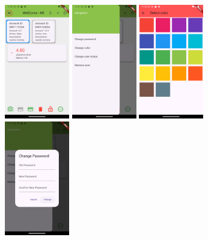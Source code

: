 \documentclass[a4paper,12pt,twoside]{ThesisStyle}
\begin{document}
\begin{figure}[h]
    \centering
    \includegraphics[width=0.25\textwidth]{imatges/userGestion.png}
    \includegraphics[width=0.25\textwidth]{imatges/userGestion1.png}
    \includegraphics[width=0.25\textwidth]{imatges/userGestion3.png}
    \includegraphics[width=0.25\textwidth]{imatges/userGestion2.png}

\end{figure}
\end{document}
